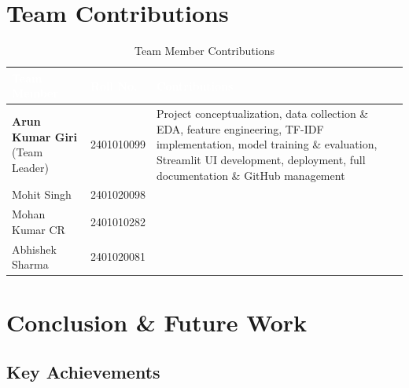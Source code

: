\documentclass[12pt,a4paper]{article}
\begin{document}
\section{Team Contributions}

\begin{table}[H]
\centering
\begin{tabular}{|L{3.5cm}|C{2.5cm}|L{6cm}|}
\hline
{}
\textcolor{white}{\textbf{Team Member}} &
\textcolor{white}{\textbf{Roll No.}} &
\textcolor{white}{\textbf{Contributions}} \\
\hline
\textbf{\textcolor{nstlightblue}{Arun Kumar Giri}} \newline (Team Leader) &
2401010099 &
Project conceptualization, data collection \& EDA, feature engineering, TF-IDF
implementation, model training \& evaluation, Streamlit UI development,
deployment, full documentation \& GitHub management \\
\hline
{}
Mohit Singh & 2401020098 & \\
\hline
Mohan Kumar CR & 2401010282 & \\
\hline
{}
Abhishek Sharma & 2401020081 & \\
\hline
\end{tabular}
\caption{Team Member Contributions}
\end{table}

\section{Conclusion \& Future Work}

\subsection{Key Achievements}
\end{document}
